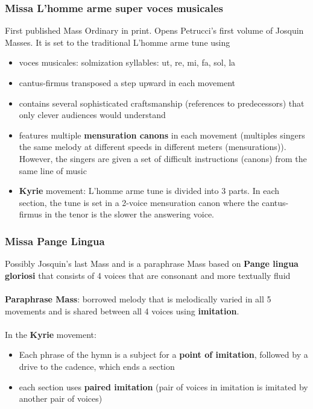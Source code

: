\documentclass{article}
\begin{document}
  \subsubsection{Missa L'homme arme super voces musicales}
  First published Mass Ordinary in print. Opens Petrucci's first volume of Josquin Masses. It is set to the traditional L'homme arme tune using
  \begin{itemize}
    \item voces musicales: solmization syllables: ut, re, mi, fa, sol, la
    \item cantus-firmus transposed a step upward in each movement
    \item contains several sophisticated craftsmanship (references to predecessors) that only clever audiences would understand
    \item features multiple \textbf{mensuration canons} in each movement (multiples singers the same melody at different speeds in different meters (mensurations)). However, the singers are given a set of difficult instructions (canons) from the same line of music
    \item \textbf{Kyrie} movement: L'homme arme tune is divided into 3 parts. In each section, the tune is set in a 2-voice mensuration canon where the cantus-firmus in the tenor is the slower the answering voice.
  \end{itemize}
  \subsubsection{Missa Pange Lingua}
  Possibly Josquin's last Mass and is a paraphrase Mass based on \textbf{Pange lingua gloriosi} that consists of 4 voices that are consonant and more textually fluid \\ \\
  \textbf{Paraphrase Mass}: borrowed melody that is melodically varied in all 5 movements and is shared between all 4 voices using \textbf{imitation}. \\ \\
  In the \textbf{Kyrie} movement:
  \begin{itemize}
    \item Each phrase of the hymn is a subject for a \textbf{point of imitation}, followed by a drive to the cadence, which ends a section
    \item each section uses \textbf{paired imitation} (pair of voices in imitation is imitated by another pair of voices)
  \end{itemize}
\end{document}
